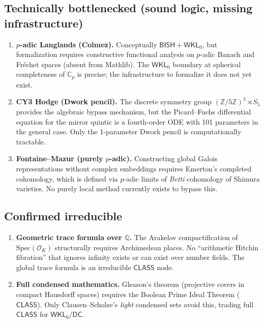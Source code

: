 \documentclass[11pt,a4paper]{article}
\theoremstyle{plain}
\theoremstyle{definition}
\newcommand{\BISH}{\textsf{BISH}}
\newcommand{\WKL}{\textsf{WKL}_0}
\newcommand{\DC}{\textsf{DC}}
\newcommand{\CLASS}{\textsf{CLASS}}
\newcommand{\Z}{\mathbb{Z}}
\newcommand{\Q}{\mathbb{Q}}
\newcommand{\C}{\mathbb{C}}
\newcommand{\Spec}{\mathrm{Spec}}
\begin{document}
\subsection{Technically bottlenecked (sound logic, missing infrastructure)}

\begin{enumerate}
\item \textbf{$p$-adic Langlands (Colmez).} Conceptually $\BISH + \WKL$, but formalization requires constructive functional analysis on $p$-adic Banach and Fr\'echet spaces (absent from Mathlib). The $\WKL$ boundary at spherical completeness of $\C_p$ is precise; the infrastructure to formalize it does not yet exist.

\item \textbf{CY3 Hodge (Dwork pencil).} The discrete symmetry group $(\Z/5\Z)^3 \rtimes S_5$ provides the algebraic bypass mechanism, but the Picard--Fuchs differential equation for the mirror quintic is a fourth-order ODE with 101 parameters in the general case. Only the 1-parameter Dwork pencil is computationally tractable.

\item \textbf{Fontaine--Mazur (purely $p$-adic).} Constructing global Galois representations without complex embeddings requires Emerton's completed cohomology, which is defined via $p$-adic limits of \emph{Betti} cohomology of Shimura varieties. No purely local method currently exists to bypass this.
\end{enumerate}

\subsection{Confirmed irreducible}

\begin{enumerate}
\item \textbf{Geometric trace formula over $\Q$.} The Arakelov compactification of $\Spec(\mathcal{O}_K)$ structurally requires Archimedean places. No ``arithmetic Hitchin fibration'' that ignores infinity exists or can exist over number fields. The global trace formula is an irreducible $\CLASS$ node.

\item \textbf{Full condensed mathematics.} Gleason's theorem (projective covers in compact Hausdorff spaces) requires the Boolean Prime Ideal Theorem ($\CLASS$). Only Clausen--Scholze's \emph{light} condensed sets avoid this, trading full $\CLASS$ for $\WKL/\DC$.
\end{enumerate}
\end{document}
